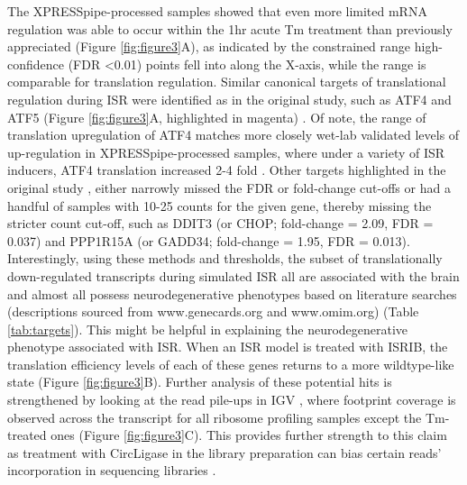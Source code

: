 \documentclass[11pt, a4paper, oneside]{article}
\begin{document}
The XPRESSpipe-processed samples showed that even more limited mRNA regulation was able to occur within the 1hr acute Tm treatment than previously appreciated (Figure \ref{fig:figure3}A), as indicated by the constrained range high-confidence (FDR \textless 0.01) points fell into along the X-axis, while the range is comparable for translation regulation. Similar canonical targets of translational regulation during ISR were identified as in the original study, such as ATF4 and ATF5 (Figure \ref{fig:figure3}A, highlighted in magenta) \cite{isrib_riboseq}. Of note, the range of translation upregulation of ATF4 matches more closely wet-lab validated levels of up-regulation in XPRESSpipe-processed samples, where under a variety of ISR inducers, ATF4 translation increased 2-4 fold \cite{atf4_translation}. Other targets highlighted in the original study \cite{isrib_riboseq}, either narrowly missed the FDR or fold-change cut-offs or had a handful of samples with 10-25 counts for the given gene, thereby missing the stricter count cut-off, such as DDIT3 (or CHOP; fold-change = 2.09, FDR = 0.037) and PPP1R15A (or GADD34; fold-change = 1.95, FDR = 0.013). Interestingly, using these methods and thresholds, the subset of translationally down-regulated transcripts during simulated ISR all are associated with the brain and almost all possess neurodegenerative phenotypes based on literature searches (descriptions sourced from www.genecards.org and www.omim.org) (Table \ref{tab:targets}). This might be helpful in explaining the neurodegenerative phenotype associated with ISR. When an ISR model is treated with ISRIB, the translation efficiency levels of each of these genes returns to a more wildtype-like state (Figure \ref{fig:figure3}B). Further analysis of these potential hits is strengthened by looking at the read pile-ups in IGV \cite{igv}, where footprint coverage is observed across the transcript for all ribosome profiling samples except the Tm-treated ones (Figure \ref{fig:figure3}C). This provides further strength to this claim as treatment with CircLigase in the library preparation can bias certain reads' incorporation in sequencing libraries \cite{circligase_bias}.
\end{document}
